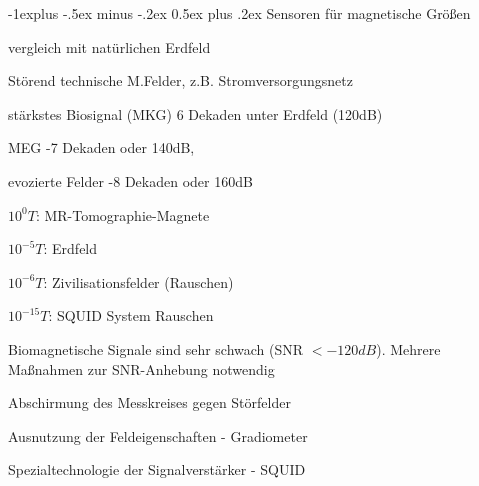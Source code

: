 \documentclass[a4paper]{article}
\makeatletter
\renewcommand{\subsection}{\@startsection{subsection}{2}{0mm}%
 {-1explus -.5ex minus -.2ex}%
 {0.5ex plus .2ex}%
 {\normalfont\normalsize\bfseries}}
\renewcommand{\subsubsection}{\@startsection{subsubsection}{3}{0mm}%
 {-1ex plus -.5ex minus -.2ex}%
 {1ex plus .2ex}%
 {\normalfont\small\bfseries}}
\makeatother
\begin{document}
\begin{multicols}{3}
  \subsection{Sensoren für magnetische Größen}\label{sensoren-fuxfcr-magnetische-gröuxdfen}
  \begin{itemize*}
    \item vergleich mit natürlichen Erdfeld
    \item Störend technische M.Felder, z.B. Stromversorgungsnetz
  \end{itemize*}

  \begin{enumerate*}
    \item stärkstes Biosignal (MKG) 6 Dekaden unter Erdfeld (120dB)%
    \item MEG -7 Dekaden oder 140dB,
    \item evozierte Felder -8 Dekaden oder 160dB
  \end{enumerate*}

  \begin{itemize*}
    \item $10^{0}T$: MR-Tomographie-Magnete
    \item $10^{-5}T$: Erdfeld
    \item $10^{-6}T$: Zivilisationsfelder (Rauschen)
    \item $10^{-15}T$: SQUID System Rauschen
  \end{itemize*}

  Biomagnetische Signale sind sehr schwach (SNR $< -120dB$).
  Mehrere Maßnahmen zur SNR-Anhebung notwendig
  \begin{itemize*}
    \item Abschirmung des Messkreises gegen Störfelder
    \item Ausnutzung der Feldeigenschaften - Gradiometer
    \item Spezialtechnologie der Signalverstärker - SQUID
  \end{itemize*}


\end{multicols}
\end{document}
